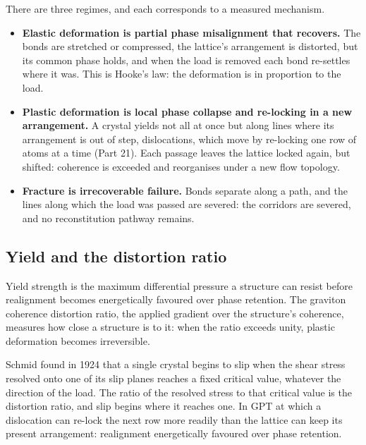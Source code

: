 \documentclass[11pt,a4paper]{article}
\begin{document}
\begin{hypbar}
There are three regimes, and each corresponds to a measured mechanism.
\begin{itemize}
\item \textbf{Elastic deformation is partial phase misalignment that recovers.} The bonds are stretched or compressed, the lattice's arrangement is distorted, but its common phase holds, and when the load is removed each bond re-settles where it was. This is Hooke's law: the deformation is in proportion to the load.
\item \textbf{Plastic deformation is local phase collapse and re-locking in a new arrangement.} A crystal yields not all at once but along lines where its arrangement is out of step, dislocations, which move by re-locking one row of atoms at a time (Part 21). Each passage leaves the lattice locked again, but shifted: coherence is exceeded and reorganises under a new flow topology.
\item \textbf{Fracture is irrecoverable failure.} Bonds separate along a path, and the lines along which the load was passed are severed: the corridors are severed, and no reconstitution pathway remains.
\end{itemize}
\end{hypbar}

\subsection{Yield and the distortion ratio}

Yield strength is the maximum differential pressure a structure can resist before realignment becomes energetically favoured over phase retention. The graviton coherence distortion ratio, the applied gradient over the structure's coherence, measures how close a structure is to it: when the ratio exceeds unity, plastic deformation becomes irreversible.

 Schmid found in 1924 that a single crystal begins to slip when the shear stress resolved onto one of its slip planes reaches a fixed critical value, whatever the direction of the load. The ratio of the resolved stress to that critical value is the distortion ratio, and slip begins where it reaches one. In GPT  at which a dislocation can re-lock the next row more readily than the lattice can keep its present arrangement: realignment energetically favoured over phase retention.
\end{document}
